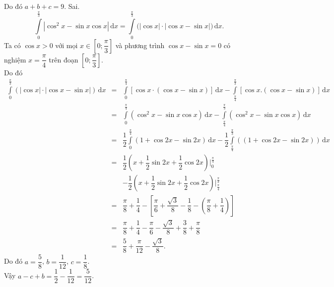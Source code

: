 \begin{ex}
{\begin{itemchoice}
Do đó $a+b+c=9$.
\itemch Sai. $$
\displaystyle\int\limits_0^{\tfrac{\pi}{3}}\left|\cos^2 x-\sin x \cos x\right|\mathrm{\,d}x=\displaystyle\int\limits_0^{\tfrac{\pi}{3}}\big(|\cos x|\cdot|\cos x-\sin x|\big)\mathrm{\,d}x.
$$
Ta có $\cos x > 0$ với mọi $x \in\left[0; \dfrac{\pi}{3}\right]$ và phương trình $\cos x-\sin x=0$ có nghiệm $x=\dfrac{\pi}{4}$ trên đoạn $\left[0; \dfrac{\pi}{3}\right]$.\\
Do đó
\allowdisplaybreaks
\begin{eqnarray*}
\displaystyle\int\limits_0^{\tfrac{\pi}{3}}(|\cos x|\cdot|\cos x-\sin x|)\mathrm{\,d} x&=&\displaystyle\int\limits_0^{\tfrac{\pi}{4}}[\cos x \cdot(\cos x-\sin x)]\mathrm{\,d} x-\displaystyle\int\limits_{\tfrac{\pi}{4}}^{\tfrac{\pi}{3}}[\cos x.(\cos x-\sin x)]\mathrm{\,d}x\\
&=&\displaystyle\int\limits_0^{\tfrac{\pi}{4}}\left(\cos ^2x-\sin x \cos x\right)\mathrm{\,d} x-\displaystyle\int\limits_{\tfrac{\pi}{4}}^{\tfrac{\pi}{3}}\left(\cos ^2x-\sin x \cos x\right)\mathrm{\,d}x\\
&=&\dfrac{1}{2} \displaystyle\int\limits_0^{\tfrac{\pi}{4}}(1+\cos 2x-\sin 2x)\mathrm{\,d}x-\dfrac{1}{2} \displaystyle\int\limits_{\tfrac{\pi}{4}}^{\tfrac{\pi}{3}}((1+\cos 2x-\sin 2x))\mathrm{\,d}x\\
&=&\dfrac{1}{2}\left(x+\dfrac{1}{2} \sin 2x+\dfrac{1}{2} \cos 2x\right)\bigg|_0 ^{\tfrac{\pi}{4}}\\&&-\dfrac{1}{2}\left(x+\dfrac{1}{2} \sin 2x+\dfrac{1}{2} \cos 2x\right)\bigg|_{\tfrac{\pi}{4}} ^{\tfrac{\pi}{3}}\\
&=&\dfrac{\pi}{8}+\dfrac{1}{4}-\left[\dfrac{\pi}{6}+\dfrac{\sqrt{3}}{8}-\dfrac{1}{8}-\left(\dfrac{\pi}{8}+\dfrac{1}{4}\right)\right]\\&=&\dfrac{\pi}{8}+\dfrac{1}{4}-\dfrac{\pi}{6}-\dfrac{\sqrt{3}}{8}+\dfrac{3}{8}+\dfrac{\pi}{8}\\&=&\dfrac{5}{8}+\dfrac{\pi}{12}-\dfrac{\sqrt{3}}{8}.
\end{eqnarray*}
Do đó $a=\dfrac{5}{8}$, $b=\dfrac{1}{12}$, $c=\dfrac{1}{8}$.\\ Vậy $a-c+b=\dfrac{1}{2}-\dfrac{1}{12}=\dfrac{5}{12}$.
\end{itemchoice}
}
\end{ex}

